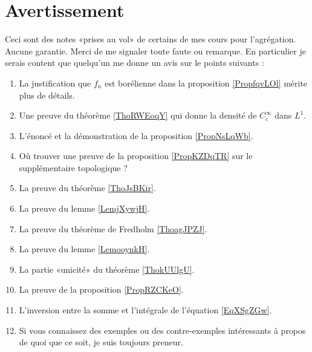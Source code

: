 
\section{Avertissement}

Ceci sont des notes «prises au vol» de certains de mes cours pour l'agrégation. Aucune garantie. Merci de me signaler toute faute ou remarque. En particulier je serais content que quelqu'un me donne un avis sur le points suivants :
\begin{enumerate}
    \item
        La justification que \( f_n\) est borélienne dans la proposition \ref{PropfqvLOl} mérite plus de détails.
    \item
        Une preuve du théorème \ref{ThoRWEoqY} qui donne la densité de \( C^{\infty}_c\) dans \( L^1\).
    \item
        L'énoncé et la démonstration de la proposition \ref{PropNsLqWb}.
    \item
        Où trouver une preuve de la proposition \ref{PropKZDqTR} sur le supplémentaire topologique ?
    \item
        La preuve du théorème \ref{ThoJsBKir}.
    \item
        La preuve du lemme \ref{LemjXywjH}.
    \item
        La preuve du théorème de Fredholm \ref{ThoagJPZJ}.
    \item
        La preuve du lemme \ref{LemooynkH}.
    \item
        La partie «unicité» du théorème \ref{ThokUUlgU}.
    \item
        La preuve de la proposition \ref{PropRZCKeO}.
    \item
        L'inversion entre la somme et l'intégrale de l'équation \eqref{EqXSgZGw}.
    \item
        Si vous connaissez des exemples ou des contre-exemples intéressants à propos de quoi que ce soit, je suis toujours preneur.
\end{enumerate}

